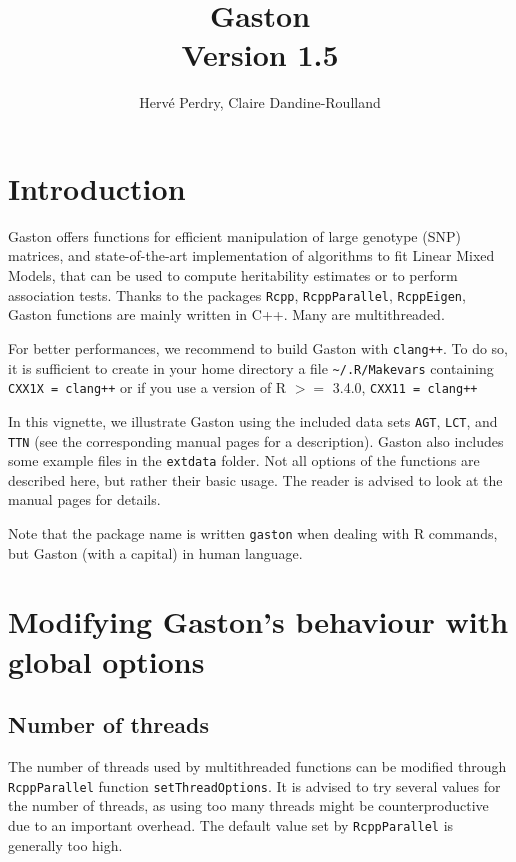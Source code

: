 \documentclass{article}\usepackage[]{graphicx}\usepackage[]{color}
\title{{\bfseries Gaston}\\
       {\large Version 1.5}}
\author{Hervé Perdry, Claire Dandine-Roulland}
\begin{document}
\maketitle

\section*{Introduction}

  Gaston offers functions for efficient manipulation of 
  large genotype (SNP) matrices, and state-of-the-art implementation of algorithms
  to fit Linear Mixed Models, that can be used to compute heritability 
  estimates or to perform association tests.
  Thanks to the packages \verb!Rcpp!, \verb!RcppParallel!, \verb!RcppEigen!, Gaston
  functions are mainly written in C++. Many are multithreaded.

  For better performances, we recommend to build Gaston with \verb!clang++!.
  To do so, it is sufficient to create in your home directory
  a file \verb!~/.R/Makevars! containing \verb!CXX1X = clang++! 
  or if you use a version of R $>=$ 3.4.0, \verb!CXX11 = clang++!

  In this vignette, we illustrate Gaston using the included data sets \verb!AGT!, \verb!LCT!,
  and \verb!TTN! (see the corresponding manual pages for a description). 
  Gaston also includes some example files in the \verb!extdata! folder. 
  Not all options of the functions are described here, but rather their basic usage.
  The reader is advised to look at the manual pages for details.

  Note that the package name is written \verb!gaston! when dealing with R commands, 
  but Gaston (with a capital) in human language.

\section{Modifying Gaston's behaviour with global options}

\subsection{Number of threads}

  The number of threads used by multithreaded functions can be modified 
  through \verb!RcppParallel!  function \verb!setThreadOptions!.
  It is advised to try several values for the number of threads, as 
  using too many threads might be counterproductive due to an important
  overhead. The default value set by \verb!RcppParallel! is generally
  too high.
\end{document}
